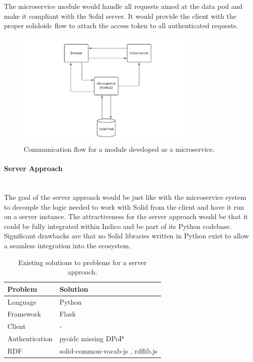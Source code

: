 The microservice module would handle all requests aimed at the data pod and make it compliant with the Solid server. It would provide the client with the proper \gls{solidoidc} flow to attach the access token to all authenticated requests.

\begin{figure}[H]
    \centering
    \includegraphics[width=0.8\textwidth]{prototype/graphs/poc-infrastructure-microservice.jpeg}
    \caption{Communication flow for a module developed as a microservice.}
    \label{fig:poc-infrastructure-microservice}
\end{figure}
\vspace{0.5cm}
\paragraph{Server Approach}\mbox{}\\

The goal of the server approach would be just like with the microservice system to decouple the logic needed to work with Solid from the client and have it run on a server instance. The attractiveness for the server approach would be that it could be fully integrated within Indico and be part of its Python codebase. Significant drawbacks are that no Solid libraries written in Python exist to allow a seamless integration into the ecosystem.

\begin{table}[!ht]
    \centering
    \begin{tabular}{| l | l |} 
    \hline
     Problem & Solution \\
     \hline
      Language & Python  \\
      Framework & Flask  \\
      Client & -  \\
      Authentication & pyoidc \cite{pyoidc} missing DPoP\\
      RDF & solid-common-vocab-js \cite{solid-common-vocab-js}, rdflib.js \cite{rdflib-js}  \\
    \hline
    \end{tabular}
    \vspace{0.75cm}
    \caption{Existing solutions to problems for a server approach.}
    \label{table:3}
\end{table}

